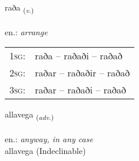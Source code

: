 \documentclass[frontgrid, backgrid]{flacards}\usepackage[]{graphicx}\usepackage[]{xcolor}
\begin{document}
\renewcommand{\flhead}{\vskip5pt \fboxsep=0pt {\small\bfseries\footnotesize Sagnorð | Verb}}
\renewcommand{\fcfoot}{\vskip5pt \fboxsep=0pt \hspace{2pt}{\small\bfseries\footnotesize 2K}}

\renewcommand{\blhead}{\vskip5pt {\small\bfseries\footnotesize Sagnorð | Verb }}
\renewcommand{\bcfoot}{\vskip5pt \hspace{2pt}{\small\bfseries\footnotesize 2K}}


{raða \small{\textsubscript{(\textit{v.})}} \\[1ex] %
\textphonetic{[raːða]} \\
en.: \emph{arrange} \\  [2ex]
\renewcommand*{\arraystretch}{0.8}
\begin{tabular}{p{1cm}l}
\textsc{1sg}: & raða -- raðaði -- raðað \\ 
\textsc{2sg}: & raðar -- raðaðir -- raðað \\ 
\textsc{3sg}: & raðar -- raðaði -- raðað \\ 
\end{tabular}
}


\renewcommand{\flhead}{\vskip5pt \fboxsep=0pt {\small\bfseries\footnotesize Atviksorð | Adverb}}
\renewcommand{\fcfoot}{\vskip5pt \fboxsep=0pt \hspace{2pt}{\small\bfseries\footnotesize 2K}}

\renewcommand{\blhead}{\vskip5pt {\small\bfseries\footnotesize Atviksorð | Adverb }}
\renewcommand{\bcfoot}{\vskip5pt \hspace{2pt}{\small\bfseries\footnotesize 2K}}


{allavega \small{\textsubscript{(\textit{adv.})}} \\[1ex]
\textphonetic{[atlavɛɣa]} \\
en.: \emph{anyway, in any case} \\  [2ex]
allavega (Indeclinable)}

\renewcommand{\flhead}{\vskip5pt \fboxsep=0pt {\small\bfseries\footnotesize Nafnorð | Noun}}
\renewcommand{\fcfoot}{\vskip5pt \fboxsep=0pt \hspace{2pt}{\small\bfseries\footnotesize 2K}}
\end{document}
